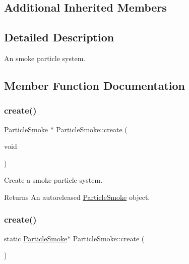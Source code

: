 \subsection*{Additional Inherited Members}


\subsection{Detailed Description}
An smoke particle system. 

\subsection{Member Function Documentation}
\mbox{\label{classParticleSmoke_a489f1b9fc63bc0ddbf0199b68d7d5a57}} 
\subsubsection{\texorpdfstring{create()}{create()}\hspace{0.1cm}{\footnotesize\ttfamily [1/2]}}
{\footnotesize\ttfamily \hyperlink{classParticleSmoke}{Particle\+Smoke} $\ast$ Particle\+Smoke\+::create (\begin{DoxyParamCaption}\item[{void}]{ }\end{DoxyParamCaption})\hspace{0.3cm}{\ttfamily [static]}}

Create a smoke particle system.

\begin{DoxyReturn}{Returns}
An autoreleased \hyperlink{classParticleSmoke}{Particle\+Smoke} object. 
\end{DoxyReturn}
\mbox{\label{classParticleSmoke_ad56cf62c4ccfadea9c795a852ca88f3e}} 
\subsubsection{\texorpdfstring{create()}{create()}\hspace{0.1cm}{\footnotesize\ttfamily [2/2]}}
{\footnotesize\ttfamily static \hyperlink{classParticleSmoke}{Particle\+Smoke}$\ast$ Particle\+Smoke\+::create (\begin{DoxyParamCaption}{ }\end{DoxyParamCaption})\hspace{0.3cm}{\ttfamily [static]}}

